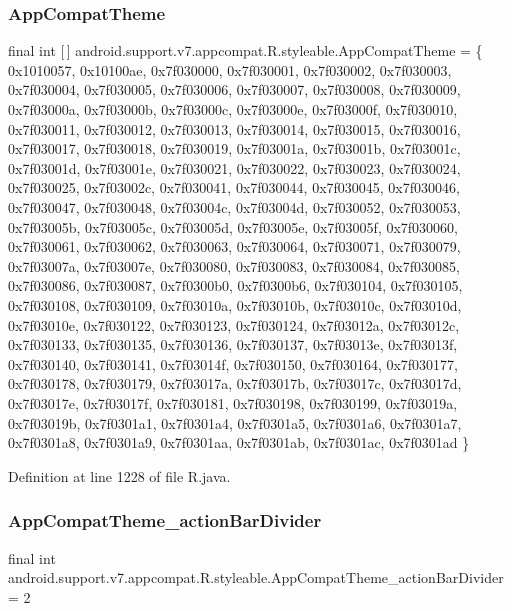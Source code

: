 \subsubsection{\texorpdfstring{AppCompatTheme}{AppCompatTheme}}
{\footnotesize\ttfamily final int \mbox{[}$\,$\mbox{]} android.\+support.\+v7.\+appcompat.\+R.\+styleable.\+App\+Compat\+Theme = \{ 0x1010057, 0x10100ae, 0x7f030000, 0x7f030001, 0x7f030002, 0x7f030003, 0x7f030004, 0x7f030005, 0x7f030006, 0x7f030007, 0x7f030008, 0x7f030009, 0x7f03000a, 0x7f03000b, 0x7f03000c, 0x7f03000e, 0x7f03000f, 0x7f030010, 0x7f030011, 0x7f030012, 0x7f030013, 0x7f030014, 0x7f030015, 0x7f030016, 0x7f030017, 0x7f030018, 0x7f030019, 0x7f03001a, 0x7f03001b, 0x7f03001c, 0x7f03001d, 0x7f03001e, 0x7f030021, 0x7f030022, 0x7f030023, 0x7f030024, 0x7f030025, 0x7f03002c, 0x7f030041, 0x7f030044, 0x7f030045, 0x7f030046, 0x7f030047, 0x7f030048, 0x7f03004c, 0x7f03004d, 0x7f030052, 0x7f030053, 0x7f03005b, 0x7f03005c, 0x7f03005d, 0x7f03005e, 0x7f03005f, 0x7f030060, 0x7f030061, 0x7f030062, 0x7f030063, 0x7f030064, 0x7f030071, 0x7f030079, 0x7f03007a, 0x7f03007e, 0x7f030080, 0x7f030083, 0x7f030084, 0x7f030085, 0x7f030086, 0x7f030087, 0x7f0300b0, 0x7f0300b6, 0x7f030104, 0x7f030105, 0x7f030108, 0x7f030109, 0x7f03010a, 0x7f03010b, 0x7f03010c, 0x7f03010d, 0x7f03010e, 0x7f030122, 0x7f030123, 0x7f030124, 0x7f03012a, 0x7f03012c, 0x7f030133, 0x7f030135, 0x7f030136, 0x7f030137, 0x7f03013e, 0x7f03013f, 0x7f030140, 0x7f030141, 0x7f03014f, 0x7f030150, 0x7f030164, 0x7f030177, 0x7f030178, 0x7f030179, 0x7f03017a, 0x7f03017b, 0x7f03017c, 0x7f03017d, 0x7f03017e, 0x7f03017f, 0x7f030181, 0x7f030198, 0x7f030199, 0x7f03019a, 0x7f03019b, 0x7f0301a1, 0x7f0301a4, 0x7f0301a5, 0x7f0301a6, 0x7f0301a7, 0x7f0301a8, 0x7f0301a9, 0x7f0301aa, 0x7f0301ab, 0x7f0301ac, 0x7f0301ad \}\hspace{0.3cm}{\ttfamily [static]}}



Definition at line 1228 of file R.\+java.

\mbox{\label{classandroid_1_1support_1_1v7_1_1appcompat_1_1_r_1_1styleable_a0b6a6525bb825aaaecee70188288cb9e}} 
\subsubsection{\texorpdfstring{AppCompatTheme\_actionBarDivider}{AppCompatTheme\_actionBarDivider}}
{\footnotesize\ttfamily final int android.\+support.\+v7.\+appcompat.\+R.\+styleable.\+App\+Compat\+Theme\+\_\+action\+Bar\+Divider = 2\hspace{0.3cm}{\ttfamily [static]}}



